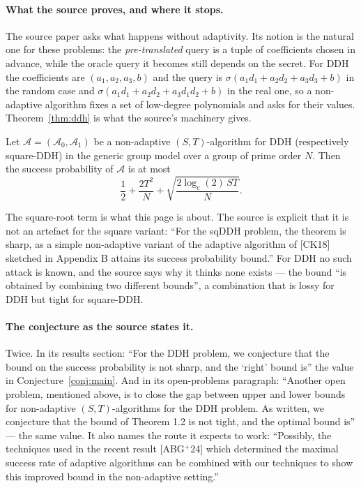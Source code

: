 \documentclass{conjura-conjecture}
\newcommand{\Adv}{\mathcal{A}}
\begin{document}
\paragraph{What the source proves, and where it stops.}
The source paper asks what happens without adaptivity. Its notion is
the natural one for these problems: the \emph{pre-translated} query is
a tuple of coefficients chosen in advance, while the oracle query it
becomes still depends on the secret. For DDH the coefficients are
$(a_{1}, a_{2}, a_{3}, b)$ and the query is
$\sigma(a_{1} d_{1} + a_{2} d_{2} + a_{3} d_{3} + b)$ in the random
case and
$\sigma(a_{1} d_{1} + a_{2} d_{2} + a_{3} d_{1} d_{2} + b)$ in the real
one, so a non-adaptive algorithm fixes a set of low-degree polynomials
and asks for their values. Theorem~\ref{thm:ddh} is what the source's
machinery gives.

\begin{theorem}\label{thm:ddh}
Let $\Adv = (\Adv_{0}, \Adv_{1})$ be a non-adaptive $(S,T)$-algorithm
for DDH (respectively square-DDH) in the generic group model over a
group of prime order $N$. Then the success probability of $\Adv$ is at
most
\[
  \frac{1}{2} + \frac{2T^{2}}{N}
  + \sqrt{\frac{2 \log_{e}(2) \, S T}{N}}.
\]
\end{theorem}

The square-root term is what this page is about. The source is explicit
that it is not an artefact for the square variant: ``For the sqDDH
problem, the theorem is sharp, as a simple non-adaptive variant of the
adaptive algorithm of [CK18] sketched in Appendix B attains its success
probability bound.'' For DDH no such attack is known, and the source
says why it thinks none exists --- the bound ``is obtained by combining
two different bounds'', a combination that is lossy for DDH but tight
for square-DDH\@.

\paragraph{The conjecture as the source states it.}
Twice. In its results section: ``For the DDH problem, we conjecture
that the bound on the success probability is not sharp, and the `right'
bound is'' the value in Conjecture~\ref{conj:main}. And in its
open-problems paragraph: ``Another open problem, mentioned above, is to
close the gap between upper and lower bounds for non-adaptive
$(S,T)$-algorithms for the DDH problem. As written, we conjecture that
the bound of Theorem 1.2 is not tight, and the optimal bound is''
--- the same value. It also names the route it expects to work:
``Possibly, the techniques used in the recent result [ABG$^{+}$24] which
determined the maximal success rate of adaptive algorithms can be
combined with our techniques to show this improved bound in the
non-adaptive setting.''
\end{document}
